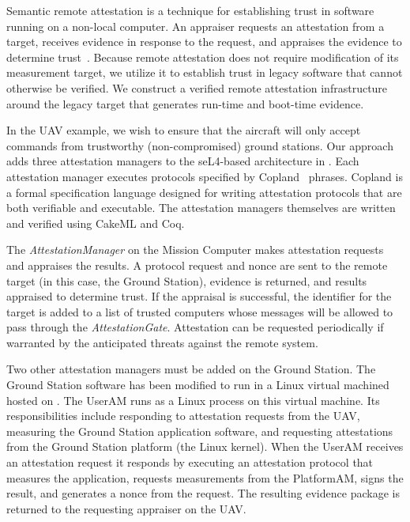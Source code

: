 Semantic remote attestation is a technique for  establishing
trust in software running on a non-local computer.  
An appraiser requests an attestation from
a target, receives evidence in response to the request, and appraises
the evidence to determine
trust~\cite{Coker::Principles-of-R}. Because
remote attestation does not require modification of its measurement
target, we utilize it to establish trust in legacy software
that cannot otherwise be verified.  We construct a verified remote
attestation infrastructure around the legacy target that generates
run-time and boot-time evidence.

In the UAV example, we wish to ensure that the aircraft will only accept
commands from trustworthy (non-compromised) ground stations.  
Our approach adds three attestation managers to the seL4-based
architecture in .  Each attestation
manager executes protocols specified by Copland~\cite{Ramsdell:2019aa}
phrases.  Copland is a formal specification language designed for
writing attestation protocols that are both verifiable and executable.
The attestation managers themselves are written and verified using
CakeML and Coq.

The \emph{AttestationManager} on the Mission Computer makes
attestation requests and appraises the results.  A protocol request and nonce are
sent to the remote target (in this case, the Ground Station), 
evidence is returned, and results appraised to
determine trust.  If the appraisal is successful, the identifier for the 
target is added to a list of trusted computers whose messages 
will be allowed to pass through the \emph{AttestationGate}.  
Attestation can be requested periodically if warranted by the anticipated
threats against the remote system.  

Two other attestation managers must be added on the Ground Station.  
The Ground Station software has been modified to run in a Linux virtual 
machined hosted on \selFour.  
The UserAM runs as a Linux process on this virtual machine.  Its
responsibilities include responding to attestation requests from the UAV, 
measuring the Ground Station application software, and requesting
attestations from the Ground Station platform (the Linux kernel).  When the UserAM receives an
attestation request it responds by executing an attestation protocol
that measures the application, requests measurements from the
PlatformAM, signs the result, and generates a nonce from the request.  The
resulting evidence package is returned to the requesting appraiser on the UAV.

